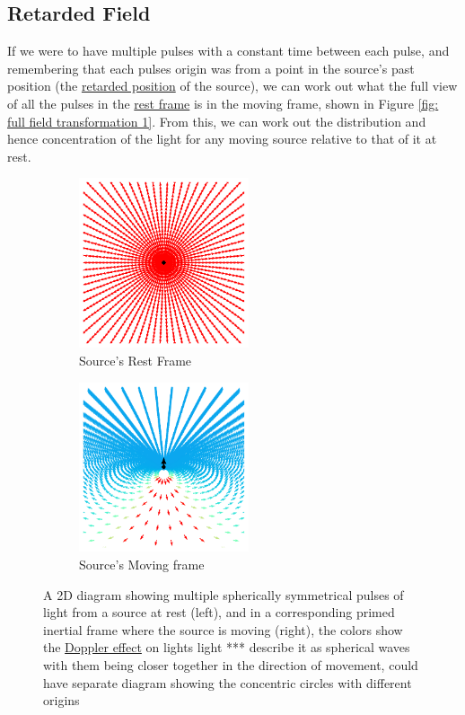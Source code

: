 \subsection{Retarded Field}

If we were to have multiple pulses with a constant time between each pulse, and remembering that each pulses origin was from a point in the source's past position (the \hyperlink{def-retarded-position}{retarded position} of the source), we can work out what the full view of all the pulses in the \hyperlink{def-proper-frame}{rest frame} is in the moving frame, shown in Figure \ref{fig: full field transformation 1}. From this, we can work out the distribution and hence concentration of the light for any moving source relative to that of it at rest.

\begin{figure}[H]
	\begin{subfigure}{.49\textwidth}
		\centering
		\includegraphics[width=5cm]{images/pdf/Field_Rest_Frame.pdf}
		\caption{Source's Rest Frame}
	\end{subfigure}
	\begin{subfigure}{.49\textwidth}
		\centering
		\includegraphics[width=5cm]{images/pdf/Field_Moving_Frame_Doppler.pdf}
		\caption{Source's Moving frame}
	\end{subfigure}
	\caption{A 2D diagram showing multiple spherically symmetrical pulses of light from a source at rest (left), and in a corresponding primed inertial frame where the source is moving (right), the colors show the \protect\hyperlink{def-doppler-effect}{Doppler effect} on lights light *** describe it as spherical waves with them being closer together in the direction of movement, could have separate diagram showing the concentric circles with different origins}
	\label{fig: full field transformation 0}
\end{figure}

